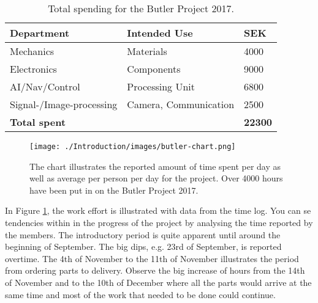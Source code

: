 
\begin{table}[h]
\centering
\begin{tabular}{lll}
\hline
\textbf{Department} & \textbf{Intended Use} & \textbf{SEK} \\ \hline
    Mechanics      &    Materials       &         4000  \\
    Electronics      &      Components     &           9000\\
    AI/Nav/Control      &       Processing Unit    &           6800\\
    Signal-/Image-processing      &     Camera, Communication      &           2500\\
\textbf{Total spent} & \textbf{} & \textbf{22300} \\ \hline
\end{tabular}
\caption{Total spending for the Butler Project 2017.}
\label{table:spending}
\end{table}



\begin{figure}[h]
    \centering
    \texttt{[image: ./Introduction/images/butler-chart.png]}
    \caption{The chart illustrates the reported amount of time spent per day as well as average per person per day for the project. Over 4000 hours have been put in on the Butler Project 2017.}
    \label{fig:tpdb}
\end{figure}

In Figure \ref{fig:tpdb}, the work effort is illustrated with data from the time log. You can se tendencies within in the progress of the project by analysing the time reported by the members. The introductory period is quite apparent until around the beginning of September. The big dips, e.g. 23rd of September, is reported overtime. The 4th of November to the 11th of November illustrates the period from ordering parts to delivery. Observe the big increase of hours from the 14th of November and to the 10th of December where all the parts would arrive at the same time and most of the work that needed to be done could continue.